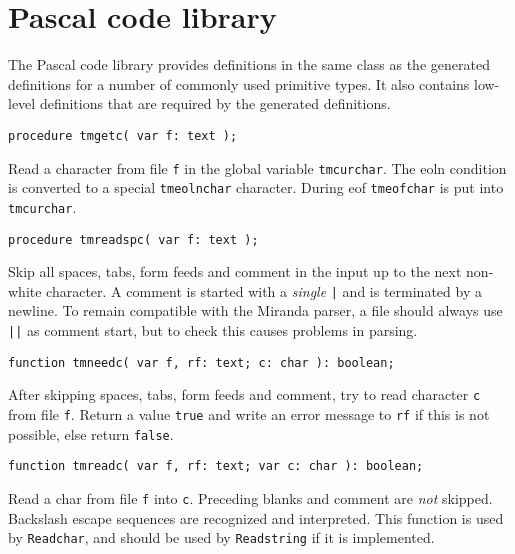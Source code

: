 \documentclass{article}
\newcommand{\Pascal}{\sf Pascal}
\newenvironment{desc}{\nopagebreak\vspace{-\bigskipamount}\vspace{-\parskip}\begin{list}{}{\setlength{\topsep}{0pt}\setlength{\rightmargin}{0pt}}\item[]}{\end{list}}
\begin{document}
\section{Pascal code library}
\label{s.paslib}
The {\Pascal} code library provides definitions in
the same class as the generated definitions for a number of commonly used
primitive types.
It also contains low-level definitions that are required by the generated
definitions.
\begin{verbatim}
procedure tmgetc( var f: text );
\end{verbatim}
\begin{desc}
Read a character from file {\tt f} in the global variable {\tt tmcurchar}.
The eoln condition is converted to a special
{\tt tmeolnchar} character.
During eof {\tt tmeofchar} is put into {\tt tmcurchar}.
\end{desc}
\begin{verbatim}
procedure tmreadspc( var f: text );
\end{verbatim}
\begin{desc}
Skip all spaces, tabs, form feeds and comment in the input up to the
next non-white character.
A comment is started with a {\em single} {\tt |} and is terminated by a newline.
To remain compatible with the Miranda parser,
a file should always use {\tt ||} as comment start,
but to check this causes problems in parsing.
\end{desc}
\begin{verbatim}
function tmneedc( var f, rf: text; c: char ): boolean;
\end{verbatim}
\begin{desc}
After skipping spaces, tabs, form feeds and comment,
try to read character {\tt c} from file {\tt f}.
Return a value {\tt true} and write an error message to {\tt rf} if this
is not possible,
else return {\tt false}.
\end{desc}
\begin{verbatim}
function tmreadc( var f, rf: text; var c: char ): boolean;
\end{verbatim}
\begin{desc}
Read a char from file {\tt f} into {\tt c}.
Preceding blanks and comment are {\em not} skipped.
Backslash escape sequences are recognized and interpreted.
This function is used by {\tt Readchar},
and should be used by {\tt Readstring} if it is implemented.
\end{desc}
\end{document}
